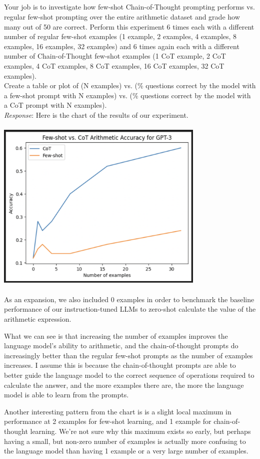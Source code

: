 \documentclass{article}
\begin{document}
\subsection{}
Your job is to investigate how few-shot Chain-of-Thought prompting performs vs. regular few-shot prompting over the entire arithmetic dataset and grade how many out of 50 are correct. Perform this experiment 6 times each with a different number of regular few-shot examples (1 example, 2 examples, 4 examples, 8 examples, 16 examples, 32 examples) and 6 times again each with a different number of Chain-of-Thought few-shot examples (1 CoT example, 2 CoT examples, 4 CoT examples, 8 CoT examples, 16 CoT examples, 32 CoT examples).
\\Create a table or plot of (N examples) vs. (\% questions correct by the model with a few-shot prompt with N examples) vs. (\% questions correct by the model with a CoT prompt with N examples).
\\ \emph{Response}: Here is the chart of the results of our experiment.\\\\
\includegraphics[width=0.75\textwidth]{chart}\\\\
As an expansion, we also included 0 examples in order to benchmark the baseline performance of our instruction-tuned LLMs to zero-shot calculate the value of the arithmetic expression.

What we can see is that increasing the number of examples improves the language model's ability to arithmetic, and the chain-of-thought prompts do increasingly better than the regular few-shot prompts as the number of examples increases. I assume this is because the chain-of-thought prompts are able to better guide the language model to the correct sequence of operations required to calculate the answer, and the more examples there are, the more the language model is able to learn from the prompts.

Another interesting pattern from the chart is is a slight local maximum in performance at 2 examples for few-shot learning, and 1 example for chain-of-thought learning. We're not sure why this maximum exists so early, but perhaps having a small, but non-zero number of examples is actually more confusing to the language model than having 1 example or a very large number of examples.
\end{document}
